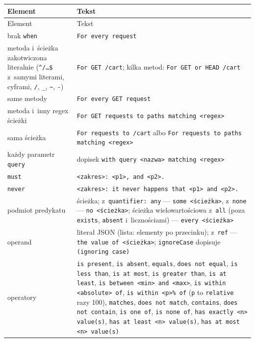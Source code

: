 {\small
\begin{xltabular}{\linewidth}{@{}>{\raggedright\arraybackslash}p{4.6cm} >{\raggedright\arraybackslash}X@{}}
\toprule
Element & Tekst \\
\midrule
\endfirsthead
\toprule
Element & Tekst \\
\midrule
\endhead
\bottomrule
\endlastfoot
brak \texttt{when} & \texttt{For every request} \\
metoda i~ścieżka zakotwiczona literalnie (\texttt{\textasciicircum/…\$} z~samymi literami,
cyframi, \texttt{/}, \texttt{\_}, \texttt{\textasciitilde}, \texttt{-}) & \texttt{For GET /cart};
kilka metod: \texttt{For GET or HEAD /cart} \\
same metody & \texttt{For every GET request} \\
metoda i~inny regex ścieżki & \texttt{For GET requests to paths matching <regex>} \\
sama ścieżka & \texttt{For requests to /cart} albo \texttt{For requests to paths matching
<regex>} \\
każdy parametr \texttt{query} & dopisek \texttt{with query <nazwa> matching <regex>} \\
\texttt{must} & \texttt{<zakres>: <p1>, and <p2>.} \\
\texttt{never} & \texttt{<zakres>: it never happens that <p1> and <p2>.} \\
podmiot predykatu & ścieżka; z~\texttt{quantifier: any} --- \texttt{some <ścieżka>},
z~\texttt{none} --- \texttt{no <ścieżka>}; ścieżka wielowartościowa z~\texttt{all} (poza
\texttt{exists}, \texttt{absent} i~licznościami) --- \texttt{every <ścieżka>} \\
operand & literał JSON (lista: elementy po przecinku); z~\texttt{ref} --- \texttt{the value of
<ścieżka>}; \texttt{ignoreCase} dopisuje \texttt{(ignoring case)} \\
operatory & \texttt{is present}, \texttt{is absent}, \texttt{equals}, \texttt{does not equal},
\texttt{is less than}, \texttt{is at most}, \texttt{is greater than}, \texttt{is at least},
\texttt{is between <min> and <max>}, \texttt{is within <absolute> of},
\texttt{is within <p>\% of} (\texttt{p} to \texttt{relative} razy 100), \texttt{matches},
\texttt{does not match}, \texttt{contains}, \texttt{does not contain}, \texttt{is one of},
\texttt{is none of}, \texttt{has exactly <n> value(s)}, \texttt{has at least <n> value(s)},
\texttt{has at most <n> value(s)} \\
\end{xltabular}
}

